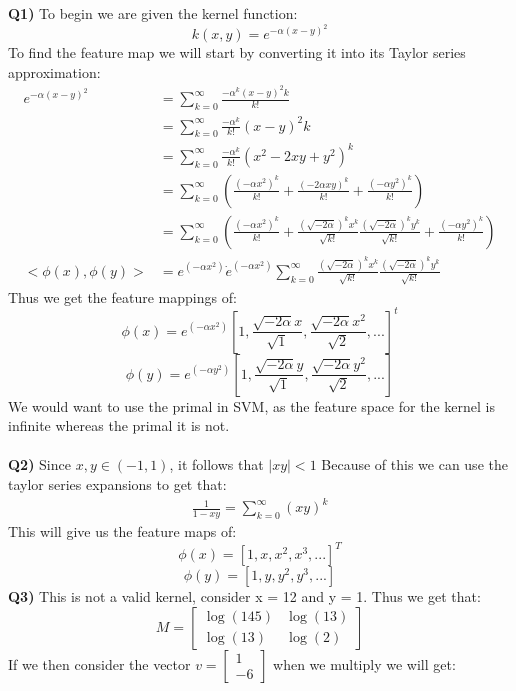\documentclass{article}
\begin{document}
\begin{titlepage}
\vspace{0.5cm}
\textbf{Q1)} To begin we are given the kernel function:
\[ k(x,y) = e^{-\alpha(x-y)^2} \]
To find the feature map we will start by converting it into its Taylor series approximation: 
\begin{align*}
e^{-\alpha(x-y)^2} &= \sum^\infty_{k=0}\frac{-\alpha^k(x-y)^2k}{k!} \\
&= \sum^\infty_{k=0}\frac{-\alpha^k}{k!}(x-y)^2k \\
&= \sum^\infty_{k=0}\frac{-\alpha^k}{k!}(x^2-2xy+y^2)^k \\
&= \sum^\infty_{k=0}(\frac{(-\alpha x^2)^k}{k!} + \frac{(-2\alpha xy)^k}{k!} + \frac{(-\alpha y^2)^k}{k!} ) \\
&= \sum^\infty_{k=0}(\frac{(-\alpha x^2)^k}{k!} + \frac{(\sqrt{-2\alpha})^kx^k}{\sqrt{k!}}\frac{(\sqrt{-2\alpha})^ky^k}{\sqrt{k!}} + \frac{(-\alpha y^2)^k}{k!} ) \\ 
<\phi(x), \phi(y)>&= e^{(-\alpha x^2)} \dot e^{(-\alpha x^2)} \sum^\infty_{k=0}\frac{(\sqrt{-2\alpha})^kx^k}{\sqrt{k!}}\frac{(\sqrt{-2\alpha})^ky^k}{\sqrt{k!}}
\end{align*}
Thus we get the feature mappings of:
\[ \phi(x)  = e^{(-\alpha x^2)} \left[1, \frac{\sqrt{-2\alpha}x}{\sqrt{1}}, \frac{\sqrt{-2\alpha}x^2}{\sqrt{2}}, ...  \right]^t \] 
\[ \phi(y)  = e^{(-\alpha y^2)} \left[1, \frac{\sqrt{-2\alpha}y}{\sqrt{1}}, \frac{\sqrt{-2\alpha}y^2}{\sqrt{2}}, ...  \right] \] 
We would want to use the primal in SVM, as the feature space for the kernel is infinite whereas the primal it is not. \\\\
\textbf{Q2)} Since $x,y \in (-1, 1)$, it follows that $|xy| < 1$ Because of this we can use the taylor series expansions to get that:
\begin{align*}
\frac{1}{1-xy} = \sum^\infty_{k=0}(xy)^k
\end{align*}
This will give us the feature maps of:
\[ \phi(x) = \left[1, x, x^2, x^3, ... \right]^T \]
\[ \phi(y) = \left[1, y, y^2, y^3, ... \right] \]
\newpage
\textbf{Q3)} This is not a valid kernel, consider x = 12 and y = 1. Thus we get that:
\[ M = \begin{bmatrix}
\log(145) & \log(13) \\
\log(13) & \log(2)
\end{bmatrix} \]
If we then consider the vector $v = \begin{bmatrix} 1 \\
-6
\end{bmatrix}$ when we multiply we will get:

\end{titlepage}
\end{document}
